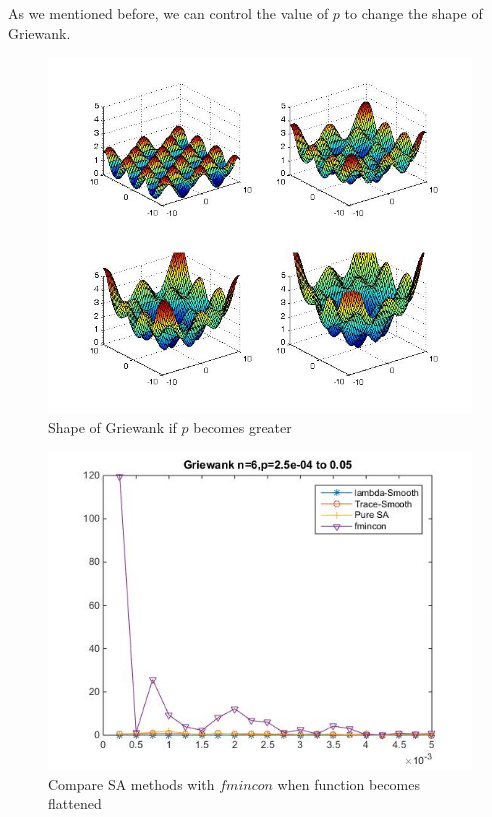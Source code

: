 \documentclass[letterpaper,12pt,titlepage,oneside,final]{book}
\begin{document}
As we mentioned before, we can control the value of $p$ to change the shape of Griewank.

\begin{figure}[H]
\includegraphics[scale=0.6]{diffp.jpg}
\caption{Shape of Griewank if $p$ becomes greater}
\end{figure}

\begin{figure}[H]
\includegraphics[scale=0.7]{griewank3.jpg}
\caption{Compare SA methods with $fmincon$ when function becomes flattened}
\end{figure}
\end{document}
